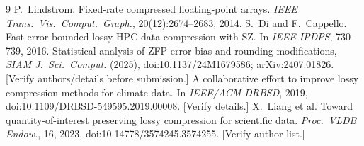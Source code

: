 \documentclass[11pt]{article}
\begin{document}
\begin{thebibliography}{9}
 P.~Lindstrom. Fixed-rate compressed floating-point arrays.
\emph{IEEE Trans.\ Vis.\ Comput.\ Graph.}, 20(12):2674--2683, 2014.
 S.~Di and F.~Cappello. Fast error-bounded lossy HPC data
compression with SZ. In \emph{IEEE IPDPS}, 730--739, 2016.
 Statistical analysis of ZFP error bias and rounding
modifications, \emph{SIAM J.\ Sci.\ Comput.} (2025), doi:10.1137/24M1679586;
arXiv:2407.01826. [Verify authors/details before submission.]
 A collaborative effort to improve lossy compression methods
for climate data. In \emph{IEEE/ACM DRBSD}, 2019, doi:10.1109/DRBSD-549595.2019.00008.
[Verify details.]
 X.~Liang et al. Toward quantity-of-interest preserving lossy
compression for scientific data. \emph{Proc.\ VLDB Endow.}, 16, 2023,
doi:10.14778/3574245.3574255. [Verify author list.]
\end{thebibliography}
\end{document}
